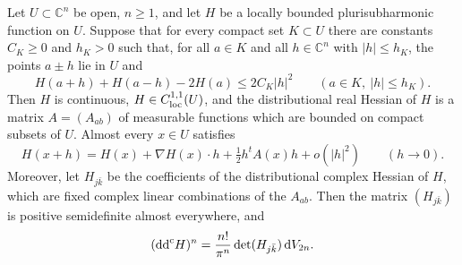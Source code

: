 \begin{lemma}\label{lem:second-difference-regularity}
Let $U\subset\mathbb C^n$ be open, $n\ge1$, and let $H$ be a locally bounded plurisubharmonic function on $U$. Suppose that for every compact set $K\subset U$ there are constants $C_K\ge0$ and $h_K>0$ such that, for all $a\in K$ and all $h\in\mathbb C^n$ with $|h|\le h_K$, the points $a\pm h$ lie in $U$ and
\begin{equation}\label{eq:second-difference-bound}
 H(a+h)+H(a-h)-2H(a)\le2C_K|h|^2\qquad(a\in K,\ |h|\le h_K).
\end{equation}
Then $H$ is continuous, $H\in C^{1,1}_{\mathrm{loc}}(U)$, and the distributional real Hessian of $H$ is a matrix $A=(A_{ab})$ of measurable functions which are bounded on compact subsets of $U$. Almost every $x\in U$ satisfies
\[
 H(x+h)=H(x)+\nabla H(x)\cdot h+\tfrac12h^tA(x)h+o(|h|^2)\qquad(h\to0).
\]
Moreover, let $H_{j\bar k}$ be the coefficients of the distributional complex Hessian of $H$, which are fixed complex linear combinations of the $A_{ab}$. Then the matrix $(H_{j\bar k})$ is positive semidefinite almost everywhere, and
\[
 (\mathrm{dd}^{\mathrm{c}} H)^n=\frac{n!}{\pi^n}\det(H_{j\bar k})\,\mathrm dV_{2n}.
\]
\end{lemma}

